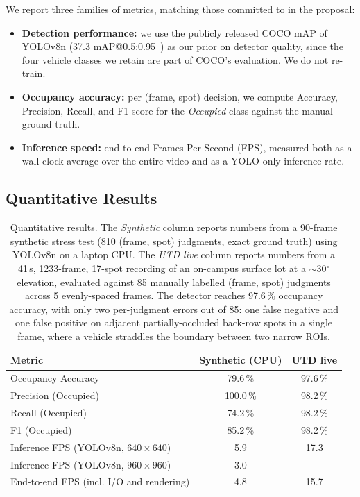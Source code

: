 \documentclass[10pt,twocolumn,letterpaper]{article}
\begin{document}
We report three families of metrics, matching those committed to in the
proposal:
\begin{itemize}
    \itemsep0em
    \item \textbf{Detection performance:} we use the publicly released COCO
          mAP of YOLOv8n (37.3 mAP@0.5{:}0.95~\cite{jocher2023yolov8}) as
          our prior on detector quality, since the four vehicle classes we
          retain are part of COCO's evaluation. We do not re-train.
    \item \textbf{Occupancy accuracy:} per (frame, spot) decision, we
          compute Accuracy, Precision, Recall, and F1-score for the
          \emph{Occupied} class against the manual ground truth.
    \item \textbf{Inference speed:} end-to-end Frames Per Second (FPS),
          measured both as a wall-clock average over the entire video and
          as a YOLO-only inference rate.
\end{itemize}

\subsection{Quantitative Results}

\begin{table}[t]
\centering
\small
\begin{tabular}{lcc}
\toprule
\textbf{Metric} & \textbf{Synthetic (CPU)} & \textbf{UTD live} \\
\midrule
Occupancy Accuracy                       & 79.6\,\% & 97.6\,\% \\
Precision (Occupied)                     & 100.0\,\% & 98.2\,\% \\
Recall    (Occupied)                     & 74.2\,\% & 98.2\,\% \\
F1        (Occupied)                     & 85.2\,\% & 98.2\,\% \\
\midrule
Inference FPS (YOLOv8n, $640{\times}640$) & 5.9      & 17.3 \\
Inference FPS (YOLOv8n, $960{\times}960$) & 3.0      & --   \\
End-to-end FPS (incl. I/O and rendering)  & 4.8      & 15.7 \\
\bottomrule
\end{tabular}
\caption{Quantitative results. The \emph{Synthetic} column reports
         numbers from a 90-frame synthetic stress test (810 (frame, spot)
         judgments, exact ground truth) using YOLOv8n on a laptop CPU.
         The \emph{UTD live} column reports numbers from a 41\,s,
         1233-frame, 17-spot recording of an on-campus surface lot at a
         $\sim$30$^\circ$ elevation, evaluated against 85 manually
         labelled (frame, spot) judgments across 5 evenly-spaced frames.
         The detector reaches 97.6\,\% occupancy accuracy, with only two
         per-judgment errors out of 85: one false negative and one false
         positive on adjacent partially-occluded back-row spots in a
         single frame, where a vehicle straddles the boundary between
         two narrow ROIs.}
\label{tab:results}
\end{table}
\end{document}
